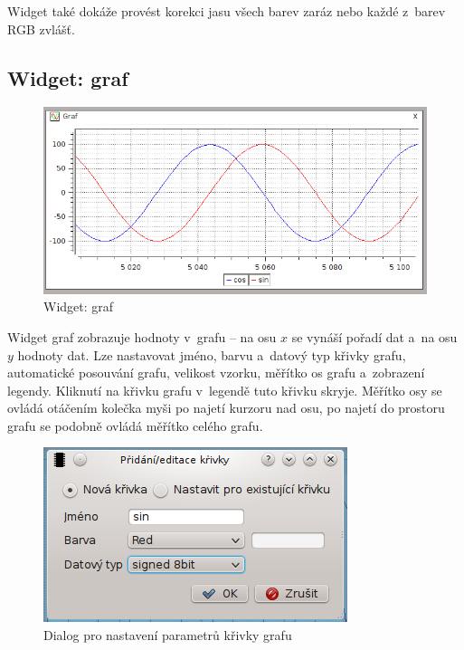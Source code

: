 \documentclass[12pt, a4paper, oneside]{article}
\begin{document}
Widget také dokáže provést korekci jasu všech barev zaráz nebo každé z~barev RGB zvlášť.

\subsection{Widget: graf}
\begin{figure}[H]
\begin{center}
\includegraphics[scale=0.65]{img/w_graph.png}
\caption{Widget: graf}
\end{center}
\end{figure}
Widget graf zobrazuje hodnoty v~grafu -- na osu $x$ se vynáší pořadí dat a~na osu $y$ hodnoty dat. Lze nastavovat jméno, barvu a~datový typ křivky grafu, automatické posouvání grafu, velikost vzorku, měřítko os grafu a~zobrazení legendy. Kliknutí na křivku grafu v~legendě tuto křivku skryje. Měřítko osy se ovládá otáčením kolečka myši po najetí kurzoru nad osu, po najetí do prostoru grafu se podobně ovládá měřítko celého grafu. 
\begin{figure}[h]
\begin{center}
\includegraphics[scale=0.8]{img/w_graph_add.png}
\caption{Dialog pro nastavení parametrů křivky grafu}
\end{center}
\end{figure}
\end{document}
